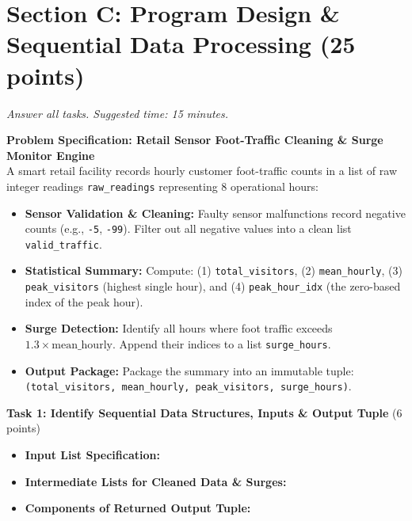 \documentclass[11pt,a4paper]{article}
\begin{document}
\newpage


\section*{Section C: Program Design \& Sequential Data Processing \hfill \normalsize\normalfont(25 points)}
\textit{Answer all tasks. Suggested time: 15 minutes.}

\begin{tcolorbox}[colback=boxbg,colframe=secondaryteal,arc=1.5mm,boxrule=0.6pt,top=1.5mm,bottom=1.5mm]
\textbf{Problem Specification: Retail Sensor Foot-Traffic Cleaning \& Surge Monitor Engine}\\[0.5mm]
\small
A smart retail facility records hourly customer foot-traffic counts in a list of raw integer readings \texttt{raw\_readings} representing 8 operational hours:
\begin{itemize}[itemsep=0.5pt,topsep=0.5pt]
  \item \textbf{Sensor Validation \& Cleaning:} Faulty sensor malfunctions record negative counts (e.g., \texttt{-5}, \texttt{-99}). Filter out all negative values into a clean list \texttt{valid\_traffic}.
  \item \textbf{Statistical Summary:} Compute: (1) \texttt{total\_visitors}, (2) \texttt{mean\_hourly}, (3) \texttt{peak\_visitors} (highest single hour), and (4) \texttt{peak\_hour\_idx} (the zero-based index of the peak hour).
  \item \textbf{Surge Detection:} Identify all hours where foot traffic exceeds $1.3 \times \text{mean\_hourly}$. Append their indices to a list \texttt{surge\_hours}.
  \item \textbf{Output Package:} Package the summary into an immutable tuple: \texttt{(total\_visitors, mean\_hourly, peak\_visitors, surge\_hours)}.
\end{itemize}
\end{tcolorbox}

\vspace{0.5mm}
\textbf{Task 1: Identify Sequential Data Structures, Inputs \& Output Tuple} (6 points)
\begin{itemize}[leftmargin=2em]
  \item \textbf{Input List Specification:} \hrulefill\\[3mm]
  \item \textbf{Intermediate Lists for Cleaned Data \& Surges:} \hrulefill\\[3mm]
  \item \textbf{Components of Returned Output Tuple:} \hrulefill
\end{itemize}
\end{document}
